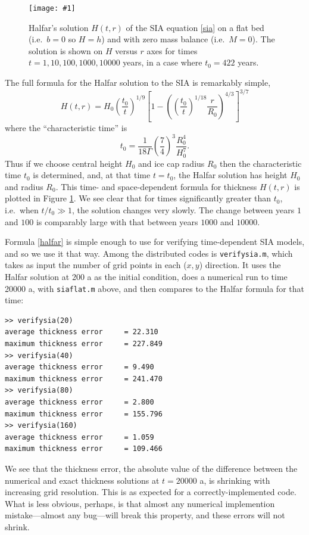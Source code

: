\documentclass[titlepage,letterpaper,final,12pt]{scrartcl}
\newcommand{\onefigsize}[3]{
\begin{figure}[ht]
\centering
\texttt{[image: \#1]}
\caption{#2}
\label{fig:#1}
\end{figure}}
\begin{document}
\onefigsize{siascaling}{Halfar's solution $H(t,r)$ of the SIA equation \eqref{sia} on a flat bed (i.e.~$b=0$ so $H=h$) and with zero mass balance (i.e.~$M=0$).  The solution is shown on $H$ versus $r$ axes for times $t=1,10,100,1000,10000$ years, in a case where $t_0=422$ years.}{5.5in}

The full formula for the Halfar solution to the SIA is remarkably simple,
\begin{equation}
H(t,r) = H_0 \left(\frac{t_0}{t}\right)^{1/9} \left[1 - \left(\left(\frac{t_0}{t}\right)^{1/18} \frac{r}{R_0}\right)^{4/3}\right]^{3/7} \label{halfar}
\end{equation}
where the ``characteristic time'' is
  $$t_0 = \frac{1}{18 \Gamma} \left(\frac{7}{4}\right)^3 \frac{R_0^4}{H_0^{7}}.$$
Thus if we choose central height $H_0$ and ice cap radius $R_0$ then the characteristic time $t_0$ is determined, and, at that time $t=t_0$, the Halfar solution has height $H_0$ and radius $R_0$.  This time- and space-dependent formula for thickness $H(t,r)$ is plotted in Figure \ref{fig:siascaling}.  We see clear that for times significantly greater than $t_0$, i.e.~when $t/t_0 \gg 1$, the solution changes very slowly.  The change between years $1$ and $100$ is comparably large with that between years $1000$ and $10000$.

Formula \eqref{halfar} is simple enough to use for verifying time-dependent SIA models, and so we use it that way.  Among the distributed codes is \texttt{verifysia.m}, which takes as input the number of grid points in each ($x,y$) direction.  It uses the Halfar solution at 200 a as the initial condition, does a numerical run to time 20000 a, with \texttt{siaflat.m} above, and then compares to the Halfar formula for that time:
\small
\begin{verbatim}
>> verifysia(20)
average thickness error     = 22.310
maximum thickness error     = 227.849
>> verifysia(40)
average thickness error     = 9.490
maximum thickness error     = 241.470
>> verifysia(80)
average thickness error     = 2.800
maximum thickness error     = 155.796
>> verifysia(160)
average thickness error     = 1.059
maximum thickness error     = 109.466
\end{verbatim}
\normalsize
We see that the thickness error, the absolute value of the difference between the numerical and exact thickness solutions at $t=20000$ a, is shrinking with increasing grid resolution.  This is as expected for a correctly-implemented code.  What is less obvious, perhaps, is that almost any numerical implemention mistake---almost any bug---will break this property, and these errors will not shrink.
\end{document}
